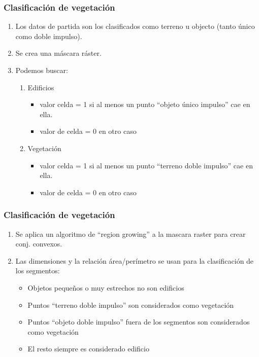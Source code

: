\begin{frame}
  \frametitle{Clasificación de vegetación}
  \begin{enumerate}
    \item<1-> Los datos de partida son los clasificados como terreno u objecto
    (tanto único como doble impulso).
    \item<2-> Se crea una máscara ráster.
    \item<3-> Podemos buscar:
      \begin{enumerate}
        \item<3-> \alert<3>{Edificios}
          \begin{itemize}
            \item valor celda = 1 si al menos un punto ``objeto único impulso''
              cae en ella.
            \item valor de celda = 0 en otro caso
          \end{itemize}
        \item<4-> \alert<4>{Vegetación}
          \begin{itemize}
            \item valor celda = 1 si al menos un punto ``terreno doble impulso''
              cae en ella.
            \item valor de celda = 0 en otro caso
          \end{itemize}
      \end{enumerate}
  \end{enumerate}
\end{frame}
\begin{frame}
  \frametitle{Clasificación de vegetación}
  \begin{enumerate}
    \item<1-> Se aplica un algoritmo de ``region growing'' a la mascara raster
        para crear conj. convexos. 
      \item<2-> Las \alert<2>{dimensiones} y la relación \alert<2>{área/perímetro}
        se usan para la clasificación de los segmentos:
    \begin{itemize}
        \item Objetos pequeños o muy estrechos no son edificios
        \item Puntos ``terreno doble impulso'' son considerados como vegetación
        \item Puntos ``objeto doble impulso'' fuera de los segmentos son
          considerados como vegetación
        \item El resto siempre es considerado edificio
    \end{itemize}
  \end{enumerate}
\end{frame}
